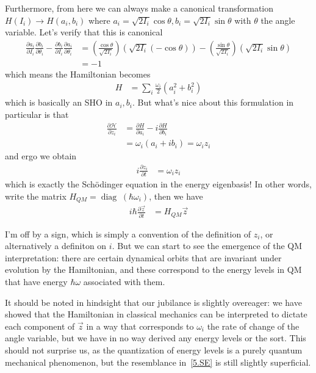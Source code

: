 \documentclass[12pt]{report}
\newcommand*{\pd}[2]{\frac{\partial#1}{\partial#2}}
\DeclareMathOperator{\diag}{diag\;}
\begin{document}
Furthermore, from here we can always make a canonical transformation $H(I_i) \to
H(a_i, b_i)$ where $a_i = \sqrt{2I_i}\cos\theta, b_i = \sqrt{2I_i}\sin\theta$
with $\theta$ the angle variable.  Let's verify that this is canonical
\begin{align}
    \pd{a_i}{I_i}\pd{b_i}{\theta_i} - \pd{b_i}{I_i}\pd{a_i}{\theta_i} &=
        \left( \frac{\cos\theta}{\sqrt{2I_i}} \right)
        \left( \sqrt{2I_i}(-\cos\theta) \right) -
        \left( \frac{\sin\theta}{\sqrt{2I_i}} \right)
        \left( \sqrt{2I_i}\sin\theta \right)\\
        &= -1
\end{align}
which means the Hamiltonian becomes
\begin{align}
    H &= \sum\limits_{i}^{}\frac{\omega_i}{2}(a_i^2 + b_i^2)
\end{align}
which is basically an SHO in $a_i, b_i$. But what's nice about this formulation
in particular is that
\begin{align}
    \pd{\mathcal{H}}{z_i} &= \pd{H}{a_i} - i\pd{H}{b_i}\\
    &= \omega_i(a_i + ib_i) = \omega_iz_i
\end{align}
and ergo we obtain
\begin{align}
    i\pd{z_i}{t} &= \omega_iz_i
\end{align}
which is exactly the Sch\"odinger equation in the energy eigenbasis! In other
words, write the matrix $H_{QM} = \diag(\hbar \omega_i)$, then we have
\begin{align}
    i\hbar \pd{\vec{z}}{t} &= H_{QM}\vec{z}\label{5.SE}
\end{align}

I'm off by a sign, which is simply a convention of the definition of $z_i$, or
alternatively a definiton on $i$. But we can start to see the emergence of the
QM interpretation: there are certain dynamical orbits that are invariant under
evolution by the Hamiltonian, and these correspond to the energy levels in QM
that have energy $\hbar \omega$ associated with them.

It should be noted in hindsight that our jubilance is slightly overeager: we
have showed that the Hamiltonian in classical mechanics can be interpreted to
dictate each component of $\vec{z}$ in a way that corresponds to $\omega_i$ the
rate of change of the angle variable, but we have in no way derived any energy
levels or the sort. This should not surprise us, as the quantization of energy
levels is a purely quantum mechanical phenomenon, but the resemblance
in~\autoref{5.SE} is still slightly superficial.
\end{document}
